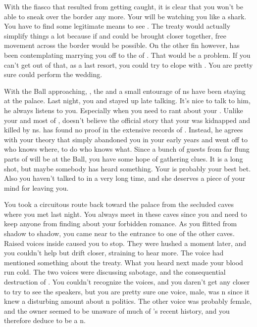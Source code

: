 \documentclass[char]{NeptuneBall}
\begin{document}
With the fiasco that resulted from getting caught, it is clear that you won't be able to sneak over the border any more. Your \cKing{\parent} will be watching you like a shark. You have to find some legitimate means to see \cDiplomat{}. The treaty would actually simplify things a lot because if \pPacifica{} and \pAtlantis{} could be brought closer together, free movement across the border would be possible. On the other fin however, \cKing{\King} \cKing{} has been contemplating marrying you off to the \cPrince{\prince} of \pPacifica{}. That would be a problem.  If you can't get out of that, as a last resort, you could try to elope with \cDiplomat{}. You are pretty sure \cPriest{} could perform the wedding.

With the \cExExKing{} Ball approaching, \cDiplomat{}, the \cPrince{\prince} and a small entourage of \pPacifica{}ns have been staying at the palace. Last night, you and \cDiplomat{} stayed up late talking. It's nice to talk to him, he always listens to you. Especially when you need to rant about your \cQueen{\parent}. Unlike your \cKing{\parent} and most of \pAtlantis{}, \cDiplomat{} doesn't believe the official story that your \cQueen{\parent} was kidnapped and killed by \pPacifica{}ns. \cDiplomat{\They} has found no proof in the extensive records of \pPacifica{}. Instead, he agrees with your theory that \cQueen{\King} \cQueen{} simply abandoned you in your early years and went off to who knows where, to do who knows what.  Since a bunch of guests from far flung parts of \pAtlantis{} will be at the Ball, you have some hope of gathering clues. It is a long shot, but maybe somebody has heard something. Your \cAriel{\sibling} \cAriel{} is probably your best bet. Also you haven't talked to \cAriel{} in a very long time, and she deserves a piece of your mind for leaving you.

You took a circuitous route back toward the palace from the secluded caves where you met \cDiplomat{} last night. You always meet in these caves since you and \cDiplomat{} need to keep anyone from finding about your forbidden romance. As you flitted from shadow to shadow, you came near to the entrance to one of the other caves. Raised voices inside caused you to stop. They were hushed a moment later, and you couldn't help but drift closer, straining to hear more.  The voice had mentioned something about the treaty. What you heard next made your blood run cold. The two voices were discussing sabotage, and the consequential destruction of \pAtlantis{}. You couldn't recognize the voices, and you daren't get any closer to try to see the speakers, but you are pretty sure one voice, male, was \pAtlantis{}n since it knew a disturbing amount about \pAtlantis{}n politics. The other voice was probably female, and the owner seemed to be unaware of much of \pAtlantis{}'s recent history, and you therefore deduce to be a \pPacifica{}n.
\end{document}
